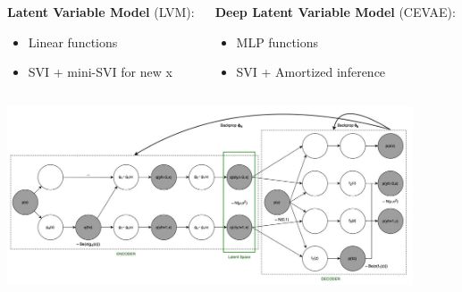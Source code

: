 \documentclass[10pt]{beamer}
\begin{document}
 \begin{frame}{}
  \vfill
  \begin{columns}
    \begin{column}{0.5\textwidth}
      \textbf{Latent Variable Model} (LVM):
      \begin{itemize}
        \item Linear functions
        \item SVI + mini-SVI for new x
      \end{itemize}
    \end{column}
    \begin{column}{0.5\textwidth}
      \textbf{Deep Latent Variable Model} (CEVAE):
      \begin{itemize}
        \item MLP functions
        \item SVI + Amortized inference
      \end{itemize}
    \end{column}
  \end{columns}
\vspace{0.5cm}
  \begin{center}
      \includegraphics[width=0.9\textwidth]{images/cevae_architecture.jpeg}
  \end{center}
\end{frame}


         
\end{document}
